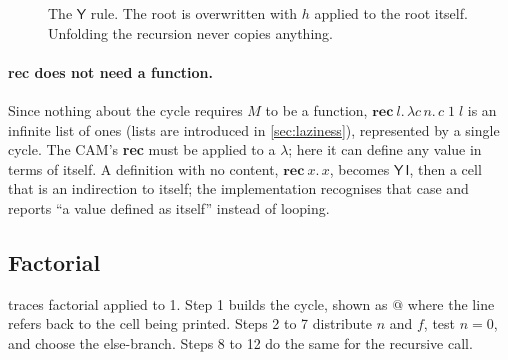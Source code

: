 \documentclass[11pt,a4paper]{article}
\newcommand{\cmb}[1]{\textsf{#1}}
\newcommand{\I}{\cmb{I}}
\newcommand{\Y}{\cmb{Y}}
\newcommand{\gcell}[5][half]{%
  \node[#1, anchor=east] (#2-f) at (#3) {#4};
  \node[#1, anchor=west] (#2-a) at (#3) {#5};}
\theoremstyle{definition}
\theoremstyle{plain}
\begin{document}
\begin{figure}[t]
\centering
{}
\caption{The $\Y$ rule. The root is overwritten with $h$ applied to the root
itself. Unfolding the recursion never copies anything.}
\label{fig:ycycle}
\end{figure}

\paragraph{rec does not need a function.} Since nothing about the cycle
requires $M$ to be a function, $\mathbf{rec}\ l.\,\lambda c\,n.\,c\;1\;l$ is
an infinite list of ones (lists are introduced in \cref{sec:laziness}),
represented by a single cycle. The CAM's \textbf{rec} must be applied to a
$\lambda$; here it can define any value in terms of itself. A definition with
no content, $\mathbf{rec}\ x.\,x$, becomes $\Y\,\I$, then a cell that is an
indirection to itself; the implementation recognises that case and reports
``a value defined as itself'' instead of looping.

\subsection{Factorial}

 traces factorial applied to 1. Step 1 builds the cycle, shown
as $@$ where the line refers back to the cell being printed. Steps 2 to 7
distribute $n$ and $f$, test $n = 0$, and choose the else-branch. Steps 8 to
12 do the same for the recursive call.
\end{document}
